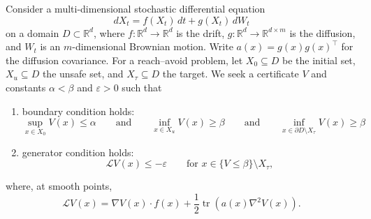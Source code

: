 \documentclass[10pt]{extarticle}
\begin{document}
Consider a multi-dimensional stochastic differential equation
\begin{equation}
  dX_t=f(X_t)\,dt+g(X_t)\,dW_t
  \label{eq:sde}
\end{equation}
on a domain $D \subset \mathbb{R}^d$, where
$f:\mathbb{R}^d\to\mathbb{R}^d$ is the drift,
$g:\mathbb{R}^d\to\mathbb{R}^{d\times m}$ is the diffusion, and $W_t$
is an $m$-dimensional Brownian motion.  Write
$a(x)=g(x)g(x)^\top$ for the diffusion covariance.  For a
reach--avoid problem, let $X_0\subseteq D$ be the
initial set, $X_u\subseteq D$ the unsafe set, and $X_\tau\subseteq D$ the target.
We seek a certificate $V$ and constants $\alpha<\beta$ and $\varepsilon>0$
such that
\begin{enumerate}
  \item boundary condition holds: 
  \begin{equation}
    \label{eq:boundary-conditions}
    \sup_{x\in X_0}V(x)\leq\alpha \qquad\text{and}\qquad
    \inf_{x\in X_u}V(x)\geq\beta \qquad\text{and}\qquad
    \inf_{x\in\partial D\setminus X_\tau}V(x)\geq\beta
  \end{equation}
  \item generator condition holds: 
  \begin{equation}
    \label{eq:generator-conditions}
    \mathcal LV(x)\leq-\varepsilon \qquad\text{for }x\in\{V\leq\beta\}\setminus X_\tau,
  \end{equation}
\end{enumerate}
where, at smooth points,
\begin{equation}
  \mathcal LV(x)
  =\nabla V(x)\cdot f(x)
  +\frac12\operatorname{tr}\!\left(a(x)\nabla^2V(x)\right).
  \label{eq:generator}
\end{equation}
\end{document}
